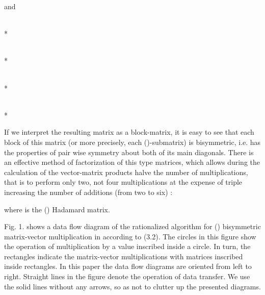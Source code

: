 \documentclass{jtacs}
\numberwithin{equation}{section}
\begin{document}
and



\\*
\begin{adjustbox}{width=\textwidth, margin=  3 15 0 5}

\end{adjustbox}


\\*
\begin{adjustbox}{width=\textwidth, margin= 3 15 0 5}

\end{adjustbox}


\\*
\begin{adjustbox}{width=\textwidth, margin= 3 15 0 5}

\end{adjustbox}

\\*
\begin{adjustbox}{width=\textwidth, margin= 3 15 0 5}

\end{adjustbox}

If we interpret the resulting matrix as a block-matrix, it is easy to see that each block of this matrix (or more precisely, each ()-submatrix) is bisymmetric, i.e. has the properties of pair wise symmetry about both of its main diagonals. There is an effective method of factorization of this type matrices, which allows during the calculation of the vector-matrix products halve the number of multiplications, that is to perform only two, not four multiplications at the expense of triple increasing the number of additions (from two to six) \cite{25,26}:
\begin{center}

\end{center}
where  is the () Hadamard matrix.

Fig. 1. shows a data flow diagram of the rationalized algorithm for () bisymmetric
matrix-vector multiplication in according to (3.2). The circles in this figure show the operation
of multiplication by a value inscribed inside a circle. In turn, the rectangles indicate the
matrix-vector multiplications with matrices inscribed inside rectangles. In this paper the data flow diagrams are oriented from left to right. Straight lines in the figure denote the operation of data transfer. We use the solid lines without any arrows, so as not to clutter up the presented diagrams.
\end{document}
